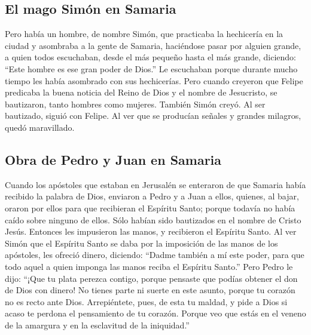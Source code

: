 \hypertarget{el-mago-simuxf3n-en-samaria}{%
\subsection{El mago Simón en
Samaria}\label{el-mago-simuxf3n-en-samaria}}

 Pero había un hombre, de nombre Simón, que practicaba la
hechicería en la ciudad y asombraba a la gente de Samaria, haciéndose
pasar por alguien grande,  a quien todos escuchaban,
desde el más pequeño hasta el más grande, diciendo: ``Este hombre es ese
gran poder de Dios.''  Le escuchaban porque durante mucho
tiempo les había asombrado con sus hechicerías.  Pero
cuando creyeron que Felipe predicaba la buena noticia del Reino de Dios
y el nombre de Jesucristo, se bautizaron, tanto hombres como mujeres.
 También Simón creyó. Al ser bautizado, siguió con
Felipe. Al ver que se producían señales y grandes milagros, quedó
maravillado.

\hypertarget{obra-de-pedro-y-juan-en-samaria}{%
\subsection{Obra de Pedro y Juan en
Samaria}\label{obra-de-pedro-y-juan-en-samaria}}

 Cuando los apóstoles que estaban en Jerusalén se
enteraron de que Samaria había recibido la palabra de Dios, enviaron a
Pedro y a Juan a ellos,  quienes, al bajar, oraron por
ellos para que recibieran el Espíritu Santo;  porque
todavía no había caído sobre ninguno de ellos. Sólo habían sido
bautizados en el nombre de Cristo Jesús.  Entonces les
impusieron las manos, y recibieron el Espíritu Santo.  Al
ver Simón que el Espíritu Santo se daba por la imposición de las manos
de los apóstoles, les ofreció dinero,  diciendo: ``Dadme
también a mí este poder, para que todo aquel a quien imponga las manos
reciba el Espíritu Santo.''  Pero Pedro le dijo: ``¡Que
tu plata perezca contigo, porque pensaste que podías obtener el don de
Dios con dinero!  No tienes parte ni suerte en este
asunto, porque tu corazón no es recto ante Dios. 
Arrepiéntete, pues, de esta tu maldad, y pide a Dios si acaso te perdona
el pensamiento de tu corazón.  Porque veo que estás en el
veneno de la amargura y en la esclavitud de la iniquidad.''

